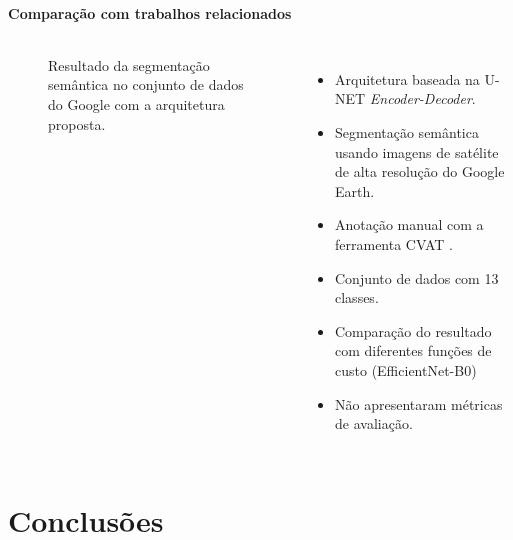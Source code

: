\documentclass[%
  10pt,%
  aspectratio = 169,%
  compress,%
  t,%
  english,%
  brazilian,%
  tikz,
]{beamer}
\begin{document}
\begin{frame}
\framesubtitle{Comparação com trabalhos relacionados}
\begin{columns}[T]

    \begin{figure}[!htb]
        \centering%
        \caption{Resultado da segmentação semântica no conjunto de dados do Google com a arquitetura proposta.}%
    \end{figure}


    \begin{itemize}
        \item Arquitetura baseada na U-NET \textit{Encoder-Decoder}.
        \item Segmentação semântica usando imagens de satélite de alta resolução do Google Earth.
        \item Anotação manual com a ferramenta CVAT \cite{cvat}.
        \item Conjunto de dados com 13 classes.
        \item Comparação do resultado com diferentes funções de custo (EfficientNet-B0)
        \item Não apresentaram métricas de avaliação.
    \end{itemize}

\end{columns}
\end{frame}

\section{Conclusões}\label{sec:concl}
\end{document}
